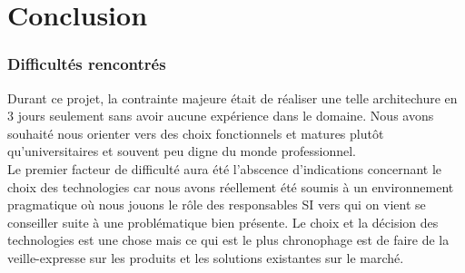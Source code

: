 \documentclass[11pt,a4paper]{report}
\begin{document}
                    
    \part{Conclusion}
        \section{Difficult\'es rencontr\'es}
            
            Durant ce projet, la contrainte majeure \'etait de r\'ealiser une telle architechure en 3 jours seulement sans avoir aucune exp\'erience dans le domaine. Nous avons souhait\'e nous orienter vers des choix fonctionnels et matures plut\^ot qu'universitaires et souvent peu digne du monde professionnel.\\
            
            Le premier facteur de difficult\'e aura \'et\'e l'abscence d'indications concernant le choix des technologies car nous avons r\'eellement \'et\'e soumis \`a un environnement pragmatique o\`u nous jouons le r\^ole des responsables SI vers qui on vient se conseiller suite \`a une probl\'ematique bien pr\'esente.
            Le choix et la d\'ecision des technologies est une chose mais ce qui est le plus chronophage est de faire de la veille-expresse sur les produits et les solutions existantes sur le march\'e.\\
            
\end{document}
